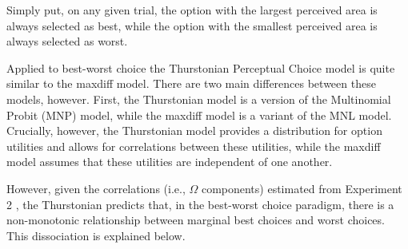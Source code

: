 Simply put, on any given trial, the option with the largest perceived area is always selected as best, while the option with the smallest perceived area is always selected as worst. 

Applied to best-worst choice the Thurstonian Perceptual Choice model is quite similar to the maxdiff model. There are two main differences between these models, however. First, the Thurstonian model is a version of the Multinomial Probit (MNP) model, while the maxdiff model is a variant of the MNL model. Crucially, however, the Thurstonian model provides a distribution for option utilities and allows for correlations between these utilities, while the maxdiff model assumes that these utilities are independent of one another.

However, given the correlations (i.e., $\Omega$ components) estimated from Experiment 2 , the Thurstonian predicts that, in the best-worst choice paradigm, there is a non-monotonic relationship between marginal best choices and worst choices. This dissociation is explained below.

